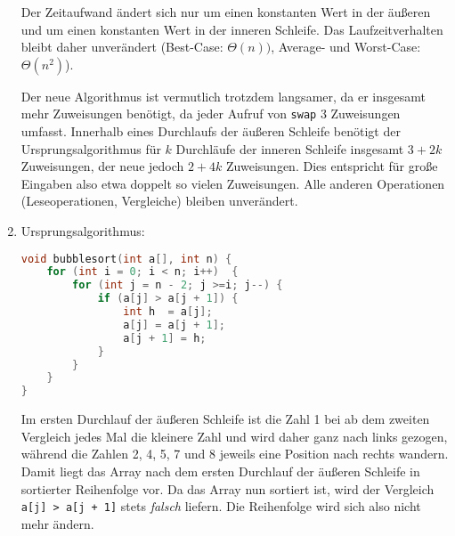\documentclass[11pt,a4paper]{article}
\begin{document}
\begin{loesung}
\begin{enumerate}
        Der Zeitaufwand ändert sich nur um einen konstanten Wert in der äußeren und um einen konstanten Wert in der inneren Schleife. Das Laufzeitverhalten bleibt daher unverändert (Best-Case: $\Theta(n))$, Average- und Worst-Case: $\Theta(n^2)$).

        Der neue Algorithmus ist vermutlich trotzdem langsamer, da er insgesamt mehr Zuweisungen benötigt, da jeder Aufruf von \texttt{swap} 3 Zuweisungen umfasst.
        Innerhalb eines Durchlaufs der äußeren Schleife benötigt der Ursprungsalgorithmus für $k$ Durchläufe der inneren Schleife insgesamt $3 + 2k$ Zuweisungen, der neue jedoch $2 + 4k$ Zuweisungen.
        Dies entspricht für große Eingaben also etwa doppelt so vielen Zuweisungen.
        Alle anderen Operationen (Leseoperationen, Vergleiche) bleiben unverändert.

        \item
        Ursprungsalgorithmus:
        \begin{lstlisting}[language=c++]
void bubblesort(int a[], int n) {
    for (int i = 0; i < n; i++)  {
        for (int j = n - 2; j >=i; j--) {
            if (a[j] > a[j + 1]) {
                int h  = a[j];
                a[j] = a[j + 1];
                a[j + 1] = h;
            }
        }
    }
} 
        \end{lstlisting}
        Im ersten Durchlauf der äußeren Schleife ist die Zahl 1 bei ab dem zweiten Vergleich jedes Mal die kleinere Zahl und wird daher ganz nach links gezogen, während die Zahlen 2, 4, 5, 7 und 8 jeweils eine Position nach rechts wandern.
        Damit liegt das Array nach dem ersten Durchlauf der äußeren Schleife in sortierter Reihenfolge vor.
        Da das Array nun sortiert ist, wird der Vergleich \texttt{a[j] > a[j + 1]} stets \textit{falsch} liefern.
        Die Reihenfolge wird sich also nicht mehr ändern.


\end{enumerate}
\end{loesung}
\end{document}
